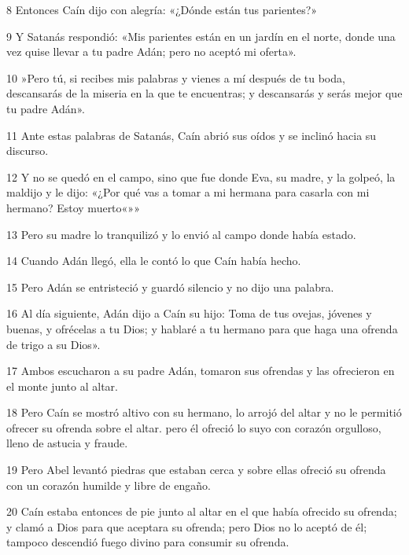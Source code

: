 \par 8 Entonces Caín dijo con alegría: «¿Dónde están tus parientes?»

\par 9 Y Satanás respondió: «Mis parientes están en un jardín en el norte, donde una vez quise llevar a tu padre Adán; pero no aceptó mi oferta».

\par 10 »Pero tú, si recibes mis palabras y vienes a mí después de tu boda, descansarás de la miseria en la que te encuentras; y descansarás y serás mejor que tu padre Adán».

\par 11 Ante estas palabras de Satanás, Caín abrió sus oídos y se inclinó hacia su discurso.

\par 12 Y no se quedó en el campo, sino que fue donde Eva, su madre, y la golpeó, la maldijo y le dijo: «¿Por qué vas a tomar a mi hermana para casarla con mi hermano? Estoy muerto«»»

\par 13 Pero su madre lo tranquilizó y lo envió al campo donde había estado.

\par 14 Cuando Adán llegó, ella le contó lo que Caín había hecho.

\par 15 Pero Adán se entristeció y guardó silencio y no dijo una palabra.

\par 16 Al día siguiente, Adán dijo a Caín su hijo: Toma de tus ovejas, jóvenes y buenas, y ofrécelas a tu Dios; y hablaré a tu hermano para que haga una ofrenda de trigo a su Dios».

\par 17 Ambos escucharon a su padre Adán, tomaron sus ofrendas y las ofrecieron en el monte junto al altar.

\par 18 Pero Caín se mostró altivo con su hermano, lo arrojó del altar y no le permitió ofrecer su ofrenda sobre el altar. pero él ofreció lo suyo con corazón orgulloso, lleno de astucia y fraude.

\par 19 Pero Abel levantó piedras que estaban cerca y sobre ellas ofreció su ofrenda con un corazón humilde y libre de engaño.

\par 20 Caín estaba entonces de pie junto al altar en el que había ofrecido su ofrenda; y clamó a Dios para que aceptara su ofrenda; pero Dios no lo aceptó de él; tampoco descendió fuego divino para consumir su ofrenda.

